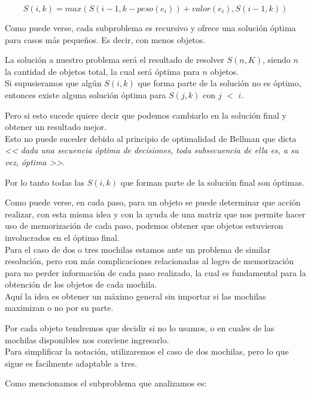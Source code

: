 \begin{equation}
S(i, k) = max(S(i-1, k-peso(e_i))+valor(e_i), S(i-1, k))
\end{equation}

Como puede verse, cada subproblema es recursivo y ofrece una solución \'optima para casos m\'as pequeños. Es decir, con menos objetos.

La solución a nuestro problema será el resultado de resolver $S(n, K)$, siendo $n$ la cantidad de objetos total, la cual será óptima para $n$ objetos.\\

Si supusieramos que algún $S(i, k)$ que forma parte de la solución no es óptimo, entonces existe alguna solución óptima para  $S(j, k)$ con $j$ $<$ $i$. 

Pero si esto sucede quiere decir que podemos cambiarlo en la solución final y obtener un resultado mejor.\\

Esto no puede suceder debido al principio de optimalidad de Bellman que dicta \emph{<< dada una secuencia \'optima de decisiones, toda subsecuencia de ella es, a su vez, \'optima >>}.

Por lo tanto todas las $S(i, k)$ que forman parte de la solución final son óptimas.

Como puede verse, en cada paso, para un objeto se puede determinar que acción realizar, con esta misma idea y con la ayuda de una matriz que nos permite hacer uso de memorizaci\'on de cada paso, podemos obtener que objetos estuvieron involucrados en el \'optimo final.\\

Para el caso de dos o tres mochilas estamos ante un problema de similar resolución, pero con más complicaciones relacionadas al logro de memorización para no perder información de cada paso realizado, la cual es fundamental para la obtención de los objetos de cada mochila.\\

Aquí la idea es obtener un máximo general sin importar si las mochilas maximizan o no por su parte.

Por cada objeto tendremos que decidir si no lo usamos, o en cuales de las mochilas disponibles nos conviene ingresarlo.\\
Para simplificar la notación, utilizaremos el caso de dos mochilas, pero lo que sigue es facilmente adaptable a tres.

Como mencionamos el subproblema que analizamos es:

